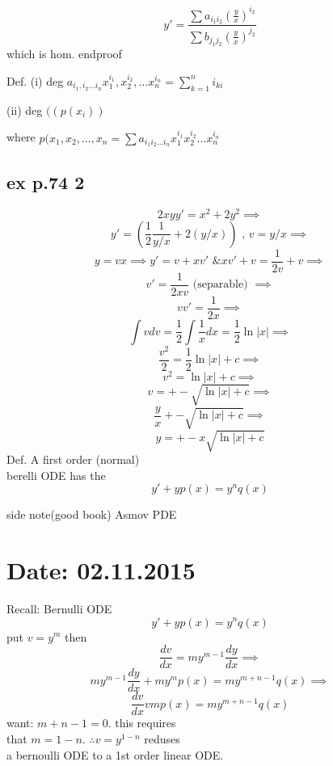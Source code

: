 \documentclass[10pt,a4paper]{article}
\begin{document}
   \[ y' =  \frac{\sum a_{i_1 i_2} (\frac{y}{x})^{i_2}}{\sum b_{j_1 j_2} (\frac{y}{x})^{j_2} }\]
   which is hom. endproof

   Def. (i) deg \( a_{i_1, i_2 ...i_n} x_1^{i_1}, x_2^{i_2}, \dots
   x_n^{i_n} = \sum_{k=1}^{n} i_{k i}\)

   (ii) deg \( ((p(x_i)) \)
   
   where \( p(x_1, x_2, \dots , x_n = \sum a_{i_1 i_2 \dots i_n}
   x_1^{i_1} x_2^{i_2} \dots x_n^{i_n} \)

   \subsection{ex p.74 2} 

   \[ 2xyy' = x^2 +2y^2 \implies  \]
   \[ y' = (\frac{1}{2} \frac{1}{y/x} + 2(y/x)) \text{ , } v = y/x
   \implies \]
   \[ y = vx \implies y' = v + xv' \text{ \& } xv' +v = \frac{1}{2v} +v
   \implies \]
   \[ v' = \frac{1}{2xv} \text{ (separable) } \implies  \]
   \[ vv' = \frac{1}{2x} \implies \]
   \[ \int v dv = \frac{1}{2} \int \frac{1}{x} dx = \frac{1}{2} \ln |x|
   \implies \]
   \[ \frac{v^2}{2} = \frac{1}{2} \ln |x| + c \implies  \]
   \[ v^2 = \ln |x| + c \implies  \]
   \[ v = +- \sqrt{ \ln |x| + c} \implies \]
   \[ \frac{y}{x} +- \sqrt{\ln |x| + c} \implies  \]
   \[ y = +-x \sqrt{\ln |x| + c} \]
   Def. A first order (normal) \\
   berelli ODE has the 
   \[ y' +yp(x) = y^nq(x) \]

   side note(good book) Asmov PDE 
\section{Date: 02.11.2015}
  Recall: Bernulli ODE
  \[ y' + yp(x) = y^n q(x) \]
  put \( v = y^m \) then
  \[ \frac{dv}{dx} = my^{m-1} \frac{dy}{dx} \implies \]
  \[ my^{m-1} \frac{dy}{dx} + my^m p(x) = my^{m+n-1}  q(x) \implies \]
  \[ \frac{dv}{dx} vmp(x) = my^{m+n-1}  q(x)\]
  want: \( m+n-1=0 \). this requires \\
  that \( m = 1-n \). \( \therefore v=y^{1-n}\) reduses \\
  a bernoulli ODE to a 1st order linear ODE. \\
\end{document}

